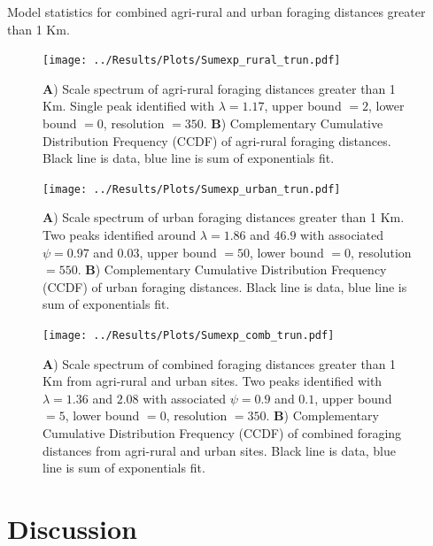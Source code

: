 \documentclass[11pt,usenames,dvipsnames,a4paper]{article}
\begin{document}
\begin{table}[H]
	\centering
	\caption{Model statistics for combined agri-rural and urban foraging distances greater than 1 Km.}
	
\end{table}

\begin{figure}[H]
	\centering
	\texttt{[image: ../Results/Plots/Sumexp\_rural\_trun.pdf]}
	\caption{\textbf{A}) Scale spectrum of agri-rural foraging distances greater than 1 Km. Single peak identified with $\lambda = 1.17$, upper bound $= 2$, lower bound $= 0$, resolution $= 350$. \textbf{B}) Complementary Cumulative Distribution Frequency (CCDF) of agri-rural foraging distances. Black line is data, blue line is sum of exponentials fit.}
\end{figure}

\begin{figure}[H]
	\centering
	\texttt{[image: ../Results/Plots/Sumexp\_urban\_trun.pdf]}
	\caption{\textbf{A}) Scale spectrum of urban foraging distances greater than 1 Km. Two peaks identified around $\lambda = 1.86$ and $46.9$ with associated $\psi = 0.97$ and $0.03$, upper bound $= 50$, lower bound $= 0$, resolution $= 550$. \textbf{B}) Complementary Cumulative Distribution Frequency (CCDF) of urban foraging distances. Black line is data, blue line is sum of exponentials fit.}
\end{figure}

\begin{figure}[H]
	\centering
	\texttt{[image: ../Results/Plots/Sumexp\_comb\_trun.pdf]}
	\caption{\textbf{A}) Scale spectrum of combined foraging distances greater than 1 Km from agri-rural and urban sites. Two peaks identified with $\lambda = 1.36$ and $2.08$ with associated $\psi = 0.9$ and $0.1$, upper bound $=5$, lower bound $= 0$, resolution $= 350$. \textbf{B}) Complementary Cumulative Distribution Frequency (CCDF) of combined foraging distances from agri-rural and urban sites. Black line is data, blue line is sum of exponentials fit.}
\end{figure}

\section{Discussion}
\end{document}
